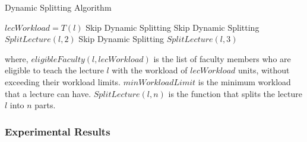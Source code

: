 \begin{algorithm}[H]
  \caption{Dynamic Splitting Algorithm}
  \begin{algorithmic}[1]
    \State $lecWorkload = T(l)$
    \State Skip Dynamic Splitting
    \State Skip Dynamic Splitting
    \State $SplitLecture(l, 2)$
    \State Skip Dynamic Splitting
    \State $SplitLecture(l, 3)$
    \EndIf
    \EndFor
    \EndProcedure
  \end{algorithmic}
  \label{alg:dynamic_splitting}
\end{algorithm}

where, $eligibleFaculty(l, lecWorkload)$ is the list of faculty members who are eligible to teach the lecture $l$ with the workload of $lecWorkload$ units, without exceeding their workload limits. $minWorkloadLimit$ is the minimum workload that a lecture can have. $SplitLecture(l, n)$ is the function that splits the lecture $l$ into $n$ parts.

\subsubsection{Experimental Results}

\begin{table}[H]
  \centering

  \caption{Dynamic Splitting Results}
  \label{tab:dynamic_splitting_results}
\end{table}

